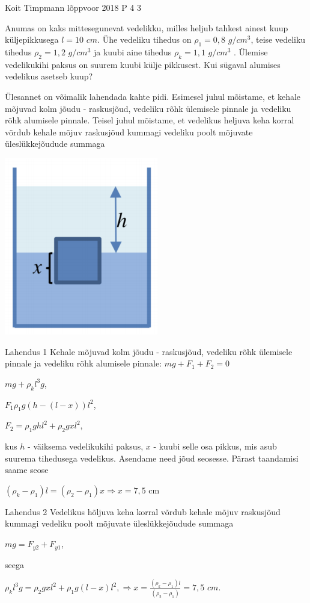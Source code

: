 {Koit Timpmann} %
{lõppvoor} %
{2018} %
{P 4} %
{3} %
{

\ifStatement
Anumas on kaks mittesegunevat vedelikku, milles heljub tahkest ainest kuup küljepikkusega $l = 10$ $cm$. Ühe vedeliku tihedus on $\rho_1 = 0,8$ $g/cm^3$, teise vedeliku tihedus $\rho_2 = 1,2$ $g/cm^3$ ja kuubi aine tihedus $\rho_k = 1,1$ $g/cm^3$ . Ülemise vedelikukihi paksus on suurem kuubi külje pikkusest. Kui sügaval alumises vedelikus asetseb kuup?
\fi


\ifHint
Ülesannet on võimalik lahendada kahte pidi. Esimesel juhul mõistame, et kehale mõjuvad kolm jõudu - raskusjõud, vedeliku rõhk ülemisele pinnale ja vedeliku rõhk alumisele pinnale. Teisel juhul mõistame, et vedelikus heljuva keha korral võrdub kehale mõjuv raskusjõud kummagi vedeliku poolt mõjuvate üleslükkejõudude summaga
\fi

\ifSolution
\begin{center}
	\includegraphics[width=0.5\linewidth]{2018-v3p-04-lah.PNG}
\end{center}
Lahendus 1
Kehale mõjuvad kolm jõudu - raskusjõud, vedeliku rõhk ülemisele pinnale ja vedeliku rõhk alumisele pinnale: $mg + F_1 + F_2 =0$
\begin{center}
$mg + \rho_k l^3 g$,
\end{center}
\begin{center}
$F_1 \rho_1 g (h - (l - x)) l^2$,
\end{center}
\begin{center}
$F_2 = \rho_1 g h l^2 + \rho_2 g x l^2$,
\end{center}
kus $h$ - väiksema vedelikukihi paksus, $x$ - kuubi selle osa pikkus, mis asub suurema tihedusega vedelikus. Asendame need jõud seosesse. Pärast taandamisi saame seose
\begin{center}
$(\rho_k - \rho_1)l = (\rho_2 - \rho_1)x \Rightarrow x = 7,5$ cm
\end{center}
Lahendus 2
Vedelikus hõljuva keha korral võrdub kehale mõjuv raskusjõud kummagi vedeliku poolt mõjuvate üleslükkejõudude summaga
\begin{center}
$mg = F_{y2} + F_{y1}$,
\end{center}
seega 
\begin{center}
$\rho_k l^3 g = \rho_2 g x l^2 + \rho_1 g (l - x)l^2, \Rightarrow x = \frac{ (\rho_k - \rho_1) l} {(\rho_2 - \rho_1)} = 7,5$ $cm$.
\end{center}
\fi
}
